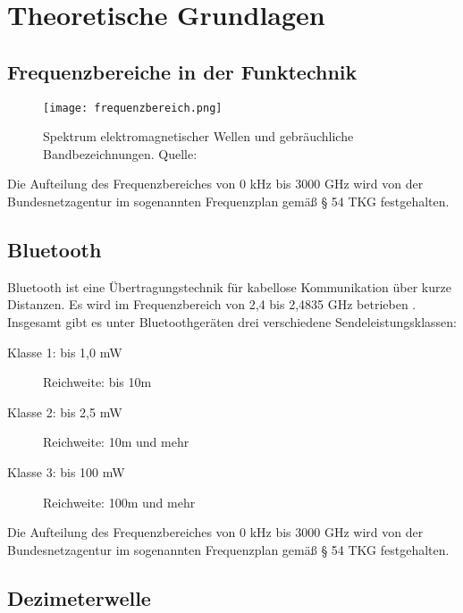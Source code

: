 
\chapter{Theoretische Grundlagen}
\section{Frequenzbereiche in der Funktechnik}
\begin{figure}[ht]
	\centering
	\texttt{[image: frequenzbereich.png]}
	\caption[Spektrum elektromagnetischer Wellen und gebräuchliche Bandbezeichnungen]{Spektrum elektromagnetischer Wellen und gebräuchliche Bandbezeichnungen. Quelle: \cite[Kark, S. 1]{Kark2006}} 
	\label{frequenzbereiche}
\end{figure}



Die Aufteilung des Frequenzbereiches von 0 kHz bis 3000 GHz wird von der Bundesnetzagentur im sogenannten Frequenzplan \cite[Bundesnetzagentur, 2016]{bundesnetzagentur-frequenzplan:2016} gemäß § 54 TKG festgehalten.

\section{Bluetooth}
Bluetooth ist eine Übertragungstechnik für kabellose Kommunikation über kurze Distanzen. Es wird im Frequenzbereich von 2,4 bis 2,4835 GHz betrieben \cite[Bundesamt für Strahlenschutz, S. 1]{bundesamt-strahlungsschutz:2012}. Insgesamt gibt es unter Bluetoothgeräten drei verschiedene Sendeleistungsklassen:
\begin{description}
	\item[Klasse 1: bis 1,0 mW] Reichweite: bis 10m 
	\item [Klasse 2: bis 2,5 mW] Reichweite: 10m und mehr
	\item [Klasse 3: bis 100 mW] Reichweite: 100m und mehr
\end{description}
Die Aufteilung des Frequenzbereiches von 0 kHz bis 3000 GHz wird von der Bundesnetzagentur im sogenannten Frequenzplan \cite[Bundesnetzagentur]{bundesnetzagentur-frequenzplan:2016} gemäß § 54 TKG festgehalten.
\section{Dezimeterwelle}


